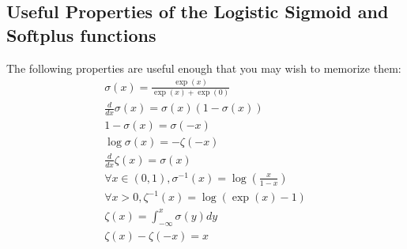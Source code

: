 \documentclass[11pt, twocolumn]{report}
\begin{document}
\subsection{Useful Properties of the Logistic Sigmoid and Softplus functions}
The following properties are useful enough that you may wish to memorize them:
\begin{align}
  \sigma(x) = \frac{\exp(x)}{\exp(x) + \exp(0)} \\
  \frac{d}{dx} \sigma(x) = \sigma(x)(1 - \sigma(x)) \\
  1 - \sigma(x) = \sigma(-x) \\
  \log \sigma(x) = -\zeta(-x) \\
  \frac{d}{dx} \zeta(x) = \sigma(x) \\
  \forall x \in (0, 1), \sigma^{-1}(x) = \log \left( \frac{x}{1 - x} \right) \\
  \forall x > 0, \zeta^{-1}(x) = \log(\exp(x) - 1) \\
  \zeta(x) = \int_{-\infty}^x \sigma(y)dy \\
  \zeta(x) - \zeta(-x) = x
\end{align}
\end{document}
